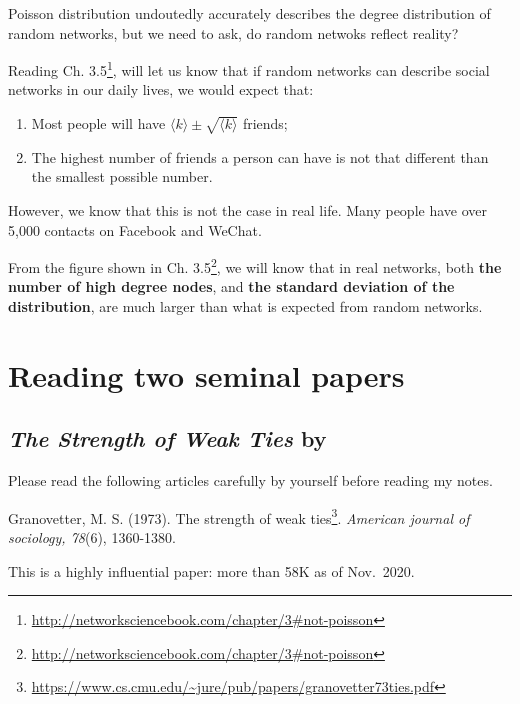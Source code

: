 \documentclass[
]{krantz}
\renewcommand{\href}[2]{#2\footnote{\url{#1}}}
\begin{document}
Poisson distribution undoutedly accurately describes the degree distribution of random networks, but we need to ask, do random netwoks reflect reality?

Reading \href{http://networksciencebook.com/chapter/3\#not-poisson}{Ch. 3.5}, will let us know that if random networks can describe social networks in our daily lives, we would expect that:

\begin{enumerate}
\def\labelenumi{\arabic{enumi}.}
\item
  Most people will have \(\langle k \rangle \pm \sqrt {\langle k \rangle}\) friends;
\item
  The highest number of friends a person can have is not that different than the smallest possible number.
\end{enumerate}

However, we know that this is not the case in real life. Many people have over 5,000 contacts on Facebook and WeChat.

From the figure shown in \href{http://networksciencebook.com/chapter/3\#not-poisson}{Ch. 3.5}, we will know that in real networks, both \textbf{the number of high degree nodes}, and \textbf{the standard deviation of the distribution}, are much larger than what is expected from random networks.

\hypertarget{reading-two-seminal-papers}{%
\section{Reading two seminal papers}\label{reading-two-seminal-papers}}

\hypertarget{the-strength-of-weak-ties-by-granovetter1973strength}{%
\subsection{\texorpdfstring{\emph{The Strength of Weak Ties} by \citet{granovetter1973strength}}{The Strength of Weak Ties by @granovetter1973strength}}\label{the-strength-of-weak-ties-by-granovetter1973strength}}

Please read the following articles carefully by yourself before reading my notes.

Granovetter, M. S. (1973). \href{https://www.cs.cmu.edu/~jure/pub/papers/granovetter73ties.pdf}{The strength of weak ties}. \emph{American journal of sociology, 78}(6), 1360-1380.

This is a highly influential paper: more than 58K as of Nov.~2020.
\end{document}
